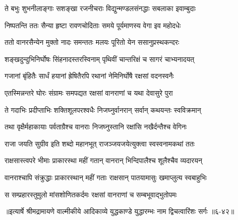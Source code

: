 \twolineshloka
{ते बभुः शुभनीलाङ्गाः सशङ्खा रजनीचराः}
{विद्युन्मण्डलसंनद्धाः सबलाका इवाम्बुदाः} %

\twolineshloka
{निष्पतन्ति ततः सैन्या हृष्टा रावणचोदिताः}
{समये पूर्यमाणस्य वेगा इव महोदधेः} %

\twolineshloka
{ततो वानरसैन्येन मुक्तो नादः समन्ततः}
{मलयः पूरितो येन ससानुप्रस्थकन्दरः} %

\twolineshloka
{शङ्खदुन्दुभिनिर्घोषः सिंहनादस्तरस्विनाम्}
{पृथिवीं चान्तरिक्षं च सागरं चाभ्यनादयत्} %

\twolineshloka
{गजानां बृंहितैः सार्धं हयानां ह्रेषितैरपि}
{रथानां नेमिनिर्घोषै रक्षसां वदनस्वनैः} %

\twolineshloka
{एतस्मिन्नन्तरे घोरः संग्रामः समपद्यत}
{रक्षसां वानराणां च यथा देवासुरे पुरा} %

\twolineshloka
{ते गदाभिः प्रदीप्ताभिः शक्तिशूलपरश्वधैः}
{निजघ्नुर्वानरान् सर्वान् कथयन्तः स्वविक्रमान्} %

\twolineshloka
{तथा वृक्षैर्महाकायाः पर्वताग्रैश्च वानराः}
{निजघ्नुस्तानि रक्षांसि नखैर्दन्तैश्च वेगिनः} %

\twolineshloka
{राजा जयति सुग्रीव इति शब्दो महानभूत्}
{राजञ्जयजयेत्युक्त्वा स्वस्वनामकथां ततः} %

\twolineshloka
{राक्षसास्त्वपरे भीमाः प्राकारस्था महीं गतान्}
{वानरान् भिन्दिपालैश्च शूलैश्चैव व्यदारयन्} %

\twolineshloka
{वानराश्चापि संक्रुद्धाः प्राकारस्थान् महीं गताः}
{राक्षसान् पातयामासुः खमाप्लुत्य स्वबाहुभिः} %

\twolineshloka
{स सम्प्रहारस्तुमुलो मांसशोणितकर्दमः}
{रक्षसां वानराणां च सम्बभूवाद्भुतोपमः} %


॥इत्यार्षे श्रीमद्रामायणे वाल्मीकीये आदिकाव्ये युद्धकाण्डे युद्धारम्भः नाम द्विचत्वारिंशः सर्गः ॥६-४२॥
